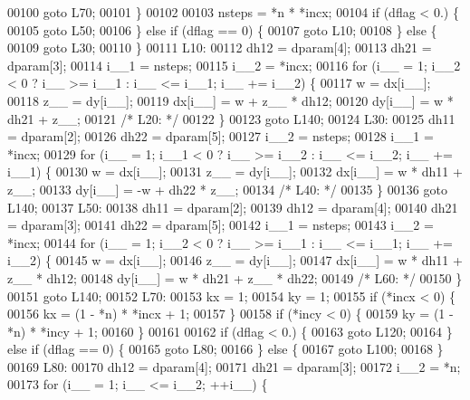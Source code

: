 \begin{DoxyCode}
00100     \textcolor{keywordflow}{goto} L70;
00101     \}
00102 
00103     nsteps = *n * *incx;
00104     \textcolor{keywordflow}{if} (dflag < 0.) \{
00105     \textcolor{keywordflow}{goto} L50;
00106     \} \textcolor{keywordflow}{else} \textcolor{keywordflow}{if} (dflag == 0) \{
00107     \textcolor{keywordflow}{goto} L10;
00108     \} \textcolor{keywordflow}{else} \{
00109     \textcolor{keywordflow}{goto} L30;
00110     \}
00111 L10:
00112     dh12 = dparam[4];
00113     dh21 = dparam[3];
00114     i\_\_1 = nsteps;
00115     i\_\_2 = *incx;
00116     \textcolor{keywordflow}{for} (i\_\_ = 1; i\_\_2 < 0 ? i\_\_ >= i\_\_1 : i\_\_ <= i\_\_1; i\_\_ += i\_\_2) \{
00117     w = dx[i\_\_];
00118     z\_\_ = dy[i\_\_];
00119     dx[i\_\_] = w + z\_\_ * dh12;
00120     dy[i\_\_] = w * dh21 + z\_\_;
00121 \textcolor{comment}{/* L20: */}
00122     \}
00123     \textcolor{keywordflow}{goto} L140;
00124 L30:
00125     dh11 = dparam[2];
00126     dh22 = dparam[5];
00127     i\_\_2 = nsteps;
00128     i\_\_1 = *incx;
00129     \textcolor{keywordflow}{for} (i\_\_ = 1; i\_\_1 < 0 ? i\_\_ >= i\_\_2 : i\_\_ <= i\_\_2; i\_\_ += i\_\_1) \{
00130     w = dx[i\_\_];
00131     z\_\_ = dy[i\_\_];
00132     dx[i\_\_] = w * dh11 + z\_\_;
00133     dy[i\_\_] = -w + dh22 * z\_\_;
00134 \textcolor{comment}{/* L40: */}
00135     \}
00136     \textcolor{keywordflow}{goto} L140;
00137 L50:
00138     dh11 = dparam[2];
00139     dh12 = dparam[4];
00140     dh21 = dparam[3];
00141     dh22 = dparam[5];
00142     i\_\_1 = nsteps;
00143     i\_\_2 = *incx;
00144     \textcolor{keywordflow}{for} (i\_\_ = 1; i\_\_2 < 0 ? i\_\_ >= i\_\_1 : i\_\_ <= i\_\_1; i\_\_ += i\_\_2) \{
00145     w = dx[i\_\_];
00146     z\_\_ = dy[i\_\_];
00147     dx[i\_\_] = w * dh11 + z\_\_ * dh12;
00148     dy[i\_\_] = w * dh21 + z\_\_ * dh22;
00149 \textcolor{comment}{/* L60: */}
00150     \}
00151     \textcolor{keywordflow}{goto} L140;
00152 L70:
00153     kx = 1;
00154     ky = 1;
00155     \textcolor{keywordflow}{if} (*incx < 0) \{
00156     kx = (1 - *n) * *incx + 1;
00157     \}
00158     \textcolor{keywordflow}{if} (*incy < 0) \{
00159     ky = (1 - *n) * *incy + 1;
00160     \}
00161 
00162     \textcolor{keywordflow}{if} (dflag < 0.) \{
00163     \textcolor{keywordflow}{goto} L120;
00164     \} \textcolor{keywordflow}{else} \textcolor{keywordflow}{if} (dflag == 0) \{
00165     \textcolor{keywordflow}{goto} L80;
00166     \} \textcolor{keywordflow}{else} \{
00167     \textcolor{keywordflow}{goto} L100;
00168     \}
00169 L80:
00170     dh12 = dparam[4];
00171     dh21 = dparam[3];
00172     i\_\_2 = *n;
00173     \textcolor{keywordflow}{for} (i\_\_ = 1; i\_\_ <= i\_\_2; ++i\_\_) \{

\end{DoxyCode}
